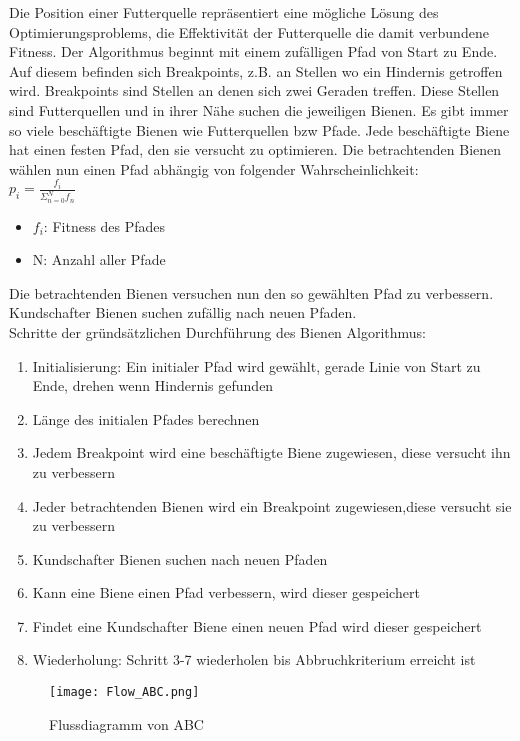 Die Position einer Futterquelle repräsentiert eine mögliche Lösung des Optimierungsproblems, die Effektivität der Futterquelle die damit verbundene Fitness.
Der Algorithmus beginnt mit einem zufälligen Pfad von Start zu Ende. Auf diesem befinden sich Breakpoints, z.B. an Stellen wo ein Hindernis getroffen wird.
Breakpoints sind Stellen an denen sich zwei Geraden treffen. Diese Stellen sind Futterquellen und in ihrer Nähe suchen die jeweiligen Bienen. 
Es gibt immer so viele beschäftigte Bienen wie Futterquellen bzw Pfade. Jede beschäftigte Biene hat einen festen Pfad, den sie versucht zu optimieren\cite{pham2005bees}. 
Die betrachtenden Bienen wählen nun einen Pfad abhängig von folgender Wahrscheinlichkeit:\\
$p_i=\frac{f_i}{\Sigma^N_{n=0}f_n}$
\begin{itemize}
  \item $f_i$: Fitness des Pfades
  \item N: Anzahl aller Pfade
\end{itemize}
Die betrachtenden Bienen versuchen nun den so gewählten Pfad zu verbessern. Kundschafter Bienen suchen zufällig nach neuen Pfaden.\\
Schritte der gründsätzlichen Durchführung des Bienen Algorithmus:
\begin{enumerate}
  \item Initialisierung: Ein initialer Pfad wird gewählt, gerade Linie von Start zu Ende, drehen wenn Hindernis gefunden
  \item Länge des initialen Pfades berechnen
  \item Jedem Breakpoint wird eine beschäftigte Biene zugewiesen, diese versucht ihn zu verbessern
  \item Jeder betrachtenden Bienen wird ein Breakpoint zugewiesen,diese versucht sie zu verbessern
  \item Kundschafter Bienen suchen nach neuen Pfaden
  \item Kann eine Biene einen Pfad verbessern, wird dieser gespeichert
  \item Findet eine Kundschafter Biene einen neuen Pfad wird dieser gespeichert
  \item Wiederholung: Schritt 3-7 wiederholen bis Abbruchkriterium erreicht ist
\end{enumerate}

\begin{figure}
  \centering
  \texttt{[image: Flow\_ABC.png]}
  \caption{Flussdiagramm von ABC}
  \label{fig:Figure_ABC}
\end{figure}
